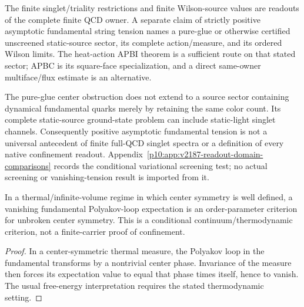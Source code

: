 \documentclass[12pt,a4paper]{article}
\begin{document}
\begin{definition}
\label{p10:def:v2187-wilson-sector-scope}
The finite singlet/triality restrictions and finite Wilson-source values are
readouts of the complete finite QCD owner.  A separate claim of strictly
positive asymptotic fundamental string tension names a pure-glue or otherwise
certified unscreened static-source sector, its complete action/measure, and
its ordered Wilson limits.  The heat-action APBI theorem is a sufficient
route on that stated sector; APBC is its square-face specialization, and a
direct same-owner multiface/flux estimate is an alternative.

The pure-glue center obstruction does not extend to a source sector containing
dynamical fundamental quarks merely by retaining the same color count.
Its complete static-source ground-state problem can include static-light
singlet channels.  Consequently positive asymptotic fundamental tension is
not a universal antecedent of finite full-QCD singlet spectra or a definition
of every native confinement readout.  Appendix~\ref{p10:app:v2187-readout-domain-comparisons}
records the conditional variational screening test; no actual screening or
vanishing-tension result is imported from it.
\end{definition}



\begin{theorem}
\label{p10:thm:polyakov-center-criterion}
In a thermal/infinite-volume regime in which center symmetry is well defined, a vanishing fundamental Polyakov-loop expectation is an order-parameter criterion for unbroken center symmetry.  This is a conditional continuum/thermodynamic criterion, not a finite-carrier proof of confinement.
\end{theorem}
\begin{proof}
In a center-symmetric thermal measure, the Polyakov loop in the fundamental transforms by a nontrivial center phase.  Invariance of the measure then forces its expectation value to equal that phase times itself, hence to vanish.  The usual free-energy interpretation requires the stated thermodynamic setting.
\end{proof}
\end{document}
